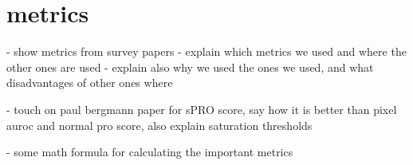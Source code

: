 \section{metrics}

- show metrics from survey papers
- explain which metrics we used and where the other ones are used
- explain also why we used the ones we used, and what disadvantages of other ones where

- touch on paul bergmann paper for sPRO score, say how it is better than pixel auroc and normal pro score, also explain saturation thresholds

- some math formula for calculating the important metrics






















